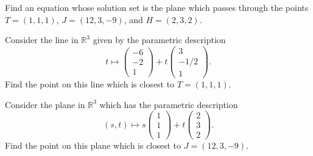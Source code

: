 \documentclass[cahier-main.tex]{subfiles}
\begin{document}
\begin{task}
Find an equation whose solution set is the plane which passes through the points $T = (1,1,1)$, $J = (12,3,-9)$, and $H = (2,3,2)$.
\end{task}


\begin{challenge}
Consider the line in $\mathbb{R}^3$ given by the parametric description
\[
t \mapsto \begin{pmatrix} -6\\-2\\1 \end{pmatrix} + t \begin{pmatrix} 3\\-1/2\\1\end{pmatrix}.
\]
Find the point on this line which is closest to $T = (1,1,1)$.
\end{challenge}


\begin{challenge}
Consider the plane in $\mathbb{R}^3$ which has the parametric description
\[
(s,t) \mapsto s\begin{pmatrix} 1\\1\\1\end{pmatrix} + t \begin{pmatrix} 2\\3\\2\end{pmatrix}. 
\]
Find the point on this plane which is closest to $J = (12,3,-9)$.
\end{challenge}
\end{document}
